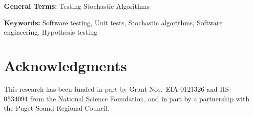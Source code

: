 \documentclass{sig-alternate}
\begin{document}
\vspace{1mm}
\noindent
{\bf General Terms:} Testing Stochastic Algorithms


\vspace{1mm}
\noindent
{\bf Keywords:} Software testing, Unit tests, Stochastic algorithms, 
 Software engineering, Hypothesis testing

\newpage


\newpage







\section{Acknowledgments}

This research has been funded in part by Grant Nos.\ EIA-0121326 and
IIS-0534094 from the National Science Foundation, and in part by a
partnership with the Puget Sound Regional Council.




 
\end{document}
